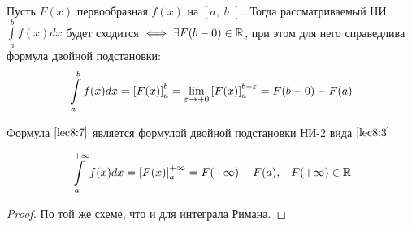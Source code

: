\documentclass[../../main.tex]{subfiles}
\begin{document}
\begin{thm}
Пусть $F(x)$ первообразная $f(x)$ на $\left[a,\; b\right[$. Тогда 
рассматриваемый НИ $\displaystyle\int\limits_{a}^{b}f(x)dx$ будет сходится 
$\iff \exists F(b-0)\in \mathbb{R}$, при этом для него справедлива формула двойной 
подстановки:
\begin{equation}\label{lec8:7}
\int\limits_{a}^{b}f(x)dx = \left[F(x)\right]_{a}^{b} = \underset{\varepsilon \to 
+0}\lim\left[F(x)\right]_{a}^{b - \varepsilon} = F(b - 0) - F(a) 
\end{equation}

Формула $\eqref{lec8:7}$ является формулой двойной подстановки НИ-2 вида 
$\eqref{lec8:3}$

\begin{equation}\label{lec8:8}
\int\limits_{a}^{+\infty}f(x)dx = \left[F(x)\right]_{a}^{+\infty} = F(+\infty) 
- F(a), \;\;\; F(+\infty) \in \mathbb{R} 
\end{equation}
\end{thm}

\begin{proof}
По той же схеме, что и для интеграла Римана.
\end{proof}
\end{document}
